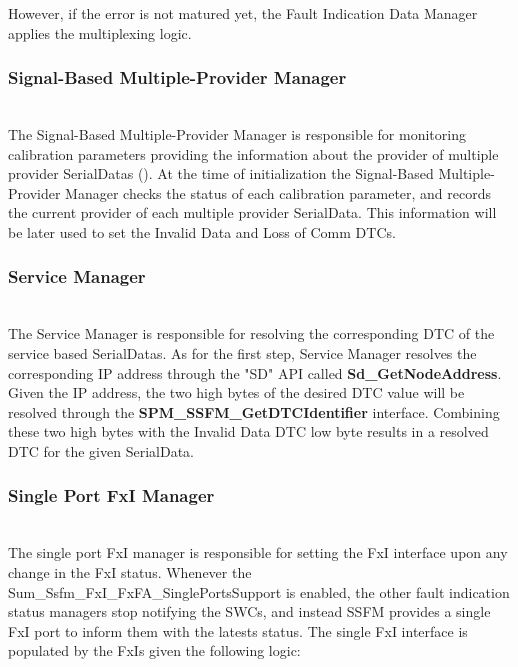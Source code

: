 However, if the error is not matured yet, the Fault Indication Data Manager applies the multiplexing logic.
\\
{       
       
     
}

\subsubsection{Signal-Based Multiple-Provider Manager}

\\
The Signal-Based Multiple-Provider Manager is responsible for monitoring calibration parameters providing the information
about the provider of multiple provider SerialDatas ().
At the time of initialization the Signal-Based Multiple-Provider Manager checks the status of each calibration parameter,
and records the current provider of each multiple provider SerialData. This information will be later used to set the
Invalid Data and Loss of Comm DTCs. 
\\
{
      
}
\subsubsection{Service Manager}

\\
The Service Manager is responsible for resolving the corresponding DTC of the service based SerialDatas. As for the first step, Service Manager
resolves the corresponding IP address through the "SD" API called \textbf{Sd_GetNodeAddress}. Given the IP address, the two high bytes of the desired DTC value will be resolved 
through the \textbf{SPM_SSFM_GetDTCIdentifier} interface. Combining these two high bytes with the Invalid Data DTC low byte results in a resolved DTC for the given SerialData.
\\
{   }

\subsubsection{Single Port FxI Manager}
\\
\label{sec:SinglePortFxI}
The single port FxI manager is responsible for setting the FxI interface upon any change in the FxI status. Whenever the 
Sum_Ssfm_FxI_FxFA_SinglePortsSupport is enabled, the other fault indication status managers stop notifying the SWCs, and instead 
SSFM provides a single FxI port to inform them with the latests status. The single FxI interface is populated by the FxIs given
the following logic:

